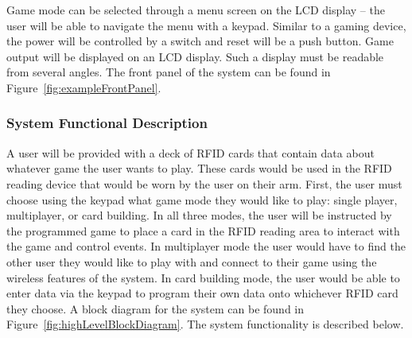 \documentclass[12pt]{article} %
\begin{document}
Game mode can be selected through a menu screen on the LCD display – the user will be able to navigate the menu with a keypad. Similar to a gaming device, the power will be controlled by a switch and reset will be a push button. Game output will be displayed on an LCD display.  Such a display must be readable from several angles.  The front panel of the system can be found in Figure~\ref{fig:exampleFrontPanel}.

\subsubsection{System Functional Description}\label{sysFunctDesc}

A user will be provided with a deck of RFID cards that contain data about whatever game the user wants to play.  These cards would be used in the RFID reading device that would be worn by the user on their arm.  First, the user must choose using the keypad what game mode they would like to play: single player, multiplayer, or card building.  In all three modes, the user will be instructed by the programmed game to place a card in the RFID reading area to interact with the game and control events. In multiplayer mode the user would have to find the other user they would like to play with and connect to their game using the wireless features of the system.  In card building mode, the user would be able to enter data via the keypad to program their own data onto whichever RFID card they choose.  A block diagram for the system can be found in Figure~\ref{fig:highLevelBlockDiagram}.  The system functionality is described below.
\end{document}
